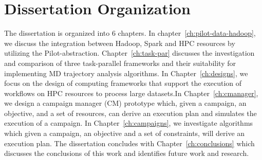 \section{Dissertation Organization}
The dissertation is organized into 6 chapters. In
chapter~\ref{ch:pilot-data-hadoop}, we discuss the integration between Hadoop,
Spark and HPC resources by utilizing the Pilot-abstraction.
Chapter~\ref{ch:task-par} discusses the investigation and comparison of three
task-parallel frameworks and their suitability for implementing MD trajectory
analysis algorithms. In Chapter~\ref{ch:designs}, we focus on the design of
computing frameworks that support the execution of workflows on HPC resources
to process large datasets.In Chapter~\ref{ch:cmanager}, we design a campaign
manager (CM) prototype which, given a campaign, an objective, and a set of
resources, can derive an execution plan and simulates the execution of a
campaign. In Chapter~\ref{ch:campaigns}, we investigate algorithms which given
a campaign, an objective and a set of constraints, will derive an execution
plan. The dissertation concludes with Chapter~\ref{ch:conclusions} which
discusses the conclusions of this work and identifies future work and research.

